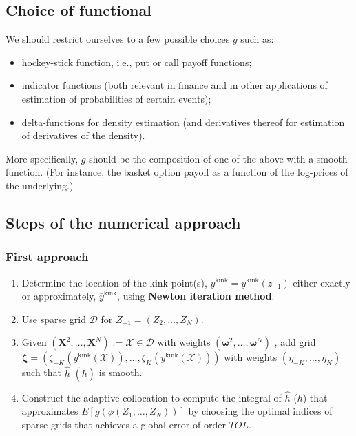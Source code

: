 \documentclass[11pt]{article}
\begin{document}
\subsection{Choice of functional}
\label{sec:choice-functional}

We should restrict ourselves to a few possible choices $g$ such as:
\begin{itemize}
	\item hockey-stick function, i.e., put or call payoff functions;
	\item indicator functions (both relevant in finance and in other applications
	of estimation of probabilities of certain events);
	\item delta-functions for density estimation (and derivatives thereof for
	estimation of derivatives of the density).
\end{itemize}
More specifically, $g$ should be the composition of one of the above with a
smooth function. (For instance, the basket option payoff as a function of the
log-prices of the underlying.)




\subsection{Steps of the numerical approach}
\subsubsection{First approach}
\begin{enumerate}
	\item Determine the location of the kink point(s), $y^{\text{kink}}=y^{\text{kink}}(z_{-1})$ either exactly or approximately, $\bar{y}^{\text{kink}}$, using  \textbf{Newton iteration method}.
	\item Use sparse grid $\mathcal{D}$ for $Z_{-1}=(Z_2, \dots, Z_{N})$.
	\item Given $(\mathbf{X}^2,\dots, \mathbf{X}^{N}):=\mathcal{X} \in \mathcal{D}$ with weights $(\boldsymbol{\omega}^2,\dots,\boldsymbol{\omega}^{N})$ , add grid  $\boldsymbol{\zeta}=(\zeta_{-K}(y^{\text{kink}}(\mathcal{X})),\dots,\zeta_{K}(y^{\text{kink}}(\mathcal{X})))$ with weights $(\eta_{-K},\dots, \eta_{K})$ such that $\hat{h}$ $(\bar{h})$ is smooth.
	\item Construct the adaptive collocation to compute the integral of $\hat{h}$ ($\bar{h}$) that approximates  $E[g(\phi(Z_1,\dots,Z_N))]$ by choosing the optimal indices of sparse grids that achieves a global error of order $TOL$.
\end{enumerate}
\end{document}
